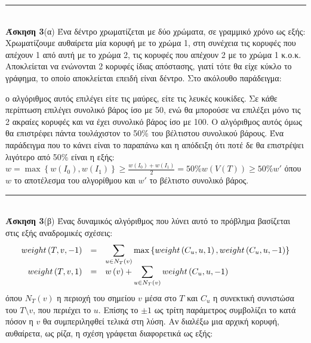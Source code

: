 \documentclass[12pt]{article}
\newcommand\m[1]{\mbox{$\displaystyle #1 $}}
\newcommand{\HRule}{\rule{\linewidth}{0.1mm}}
\begin{document}
\HRule\\
{\bf Άσκηση 3}(α) Ένα δέντρο χρωματίζεται με δύο χρώματα, σε γραμμικό χρόνο ως εξής: Χρωματίζουμε αυθαίρετα μία κορυφή με το χρώμα 1, στη συνέχεια τις κορυφές που απέχουν 1 από αυτή με το χρώμα 2, τις κορυφές που απέχουν 2 με το χρώμα 1 κ.ο.κ. Αποκλείεται να ενώνονται 2 κορυφές ίδιας απόστασης, γιατί τότε θα είχε κύκλο το γράφημα, το οποίο αποκλείεται επειδή είναι δέντρο. Στο ακόλουθο παράδειγμα:\\
\begin{center}
\end{center}
ο αλγόριθμος αυτός επιλέγει είτε τις μαύρες, είτε τις λευκές κουκίδες. Σε κάθε περίπτωση επιλέγει συνολικό βάρος ίσο με 50, ενώ θα μπορούσε να επιλέξει μόνο τις 2 ακραίες κορυφές και να έχει συνολικό βάρος ίσο με 100. Ο αλγόριθμος αυτός όμως θα επιστρέφει πάντα τουλάχιστον το 50\% του βέλτιστου συνολικού βάρους. Ένα παράδειγμα που το κάνει είναι το παραπάνω και η απόδειξη ότι ποτέ δε θα επιστρέψει λιγότερο από 50\% είναι η εξής: $w=\max\left\{w\left(I_0\right),w\left(I_1\right)\right\}\geq\frac{w\left(I_0\right)+w\left(I_1\right)}{2}=50\% w\left(V\left(T\right)\right)\geq 50\% w'$
όπου $w$ το αποτέλεσμα του αλγορίθμου και $w'$ το βέλτιστο συνολικό βάρος.\\
\HRule\\
{\bf Άσκηση 3}(β) Ένας δυναμικός αλγόριθμος που λύνει αυτό το πρόβλημα βασίζεται στις εξής αναδρομικές σχέσεις:
$$\begin{array}{>{\displaystyle}rc>{\displaystyle}l}
weight\left(T,v,-1\right)&=&\sum_{u\in N_T\left(v\right)}\max\left\{weight\left(C_u,u,1\right),weight\left(C_u,u,-1\right)\right\}\\
weight\left(T,v,1\right)&=&w\left(v\right)+\sum_{u\in N_T\left(v\right)}weight\left(C_u,u,-1\right)\\
\end{array}$$
όπου $N_T\left(v\right)$ η περιοχή του σημείου $v$ μέσα στο $T$ και $C_u$ η συνεκτική συνιστώσα του $T\setminus v$, που περιέχει το $u$. Επίσης το $\pm1$ ως τρίτη παράμετρος συμβολίζει το κατά πόσον η $v$ θα συμπεριληφθεί τελικά στη λύση.
Αν διαλέξω μια αρχική κορυφή, αυθαίρετα, ως ρίζα, η σχέση γράφεται διαφορετικά ως εξής:
\end{document}

